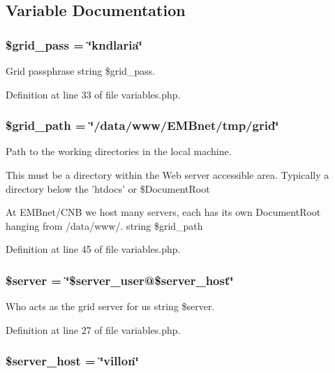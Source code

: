 \subsection{Variable Documentation}
\subsubsection{\setlength{\rightskip}{0pt plus 5cm}\$grid\_\-pass = \char`\"{}kndlaria\char`\"{}}\label{variables_8php_a3}


Grid passphrase  string \$grid\_\-pass. 



Definition at line 33 of file variables.php.
\subsubsection{\setlength{\rightskip}{0pt plus 5cm}\$grid\_\-path = \char`\"{}/data/www/EMBnet/tmp/grid\char`\"{}}\label{variables_8php_a4}


Path to the working directories in the local machine. 

This must be a directory within the Web server accessible area. Typically a directory below the 'htdocs' or \$Document\-Root

At EMBnet/CNB we host many servers, each has its own Document\-Root hanging from /data/www/.  string \$grid\_\-path 

Definition at line 45 of file variables.php.
\subsubsection{\setlength{\rightskip}{0pt plus 5cm}\$server = \char`\"{}\$server\_\-user@\$server\_\-host\char`\"{}}\label{variables_8php_a2}


Who acts as the grid server for us  string \$server. 



Definition at line 27 of file variables.php.
\subsubsection{\setlength{\rightskip}{0pt plus 5cm}\$server\_\-host = \char`\"{}villon\char`\"{}}\label{variables_8php_a1}


